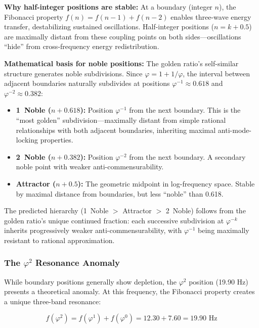 \documentclass[11pt,a4paper]{article}
\newcommand{\phisym}{\varphi}
\begin{document}
\textbf{Why half-integer positions are stable:} At a boundary (integer $n$), the Fibonacci property $f(n) = f(n-1) + f(n-2)$ enables three-wave energy transfer, destabilizing sustained oscillations. Half-integer positions ($n = k + 0.5$) are maximally distant from these coupling points on both sides---oscillations ``hide'' from cross-frequency energy redistribution.

\textbf{Mathematical basis for noble positions:} The golden ratio's self-similar structure generates noble subdivisions. Since $\phisym = 1 + 1/\phisym$, the interval between adjacent boundaries naturally subdivides at positions $\phisym^{-1} \approx 0.618$ and $\phisym^{-2} \approx 0.382$:

\begin{itemize}
    \item \textbf{1\degree\ Noble ($n + 0.618$):} Position $\phisym^{-1}$ from the next boundary. This is the ``most golden'' subdivision---maximally distant from simple rational relationships with both adjacent boundaries, inheriting maximal anti-mode-locking properties.
    \item \textbf{2\degree\ Noble ($n + 0.382$):} Position $\phisym^{-2}$ from the next boundary. A secondary noble point with weaker anti-commensurability.
    \item \textbf{Attractor ($n + 0.5$):} The geometric midpoint in log-frequency space. Stable by maximal distance from boundaries, but less ``noble'' than 0.618.
\end{itemize}

The predicted hierarchy (1\degree\ Noble $>$ Attractor $>$ 2\degree\ Noble) follows from the golden ratio's unique continued fraction: each successive subdivision at $\phisym^{-k}$ inherits progressively weaker anti-commensurability, with $\phisym^{-1}$ being maximally resistant to rational approximation.

\subsubsection{The $\phisym^2$ Resonance Anomaly}

While boundary positions generally show depletion, the $\phisym^2$ position (19.90 Hz) presents a theoretical anomaly. At this frequency, the Fibonacci property creates a unique three-band resonance:

\begin{equation}
f(\phisym^2) = f(\phisym^1) + f(\phisym^0) = 12.30 + 7.60 = 19.90 \text{ Hz}
\end{equation}
\end{document}
